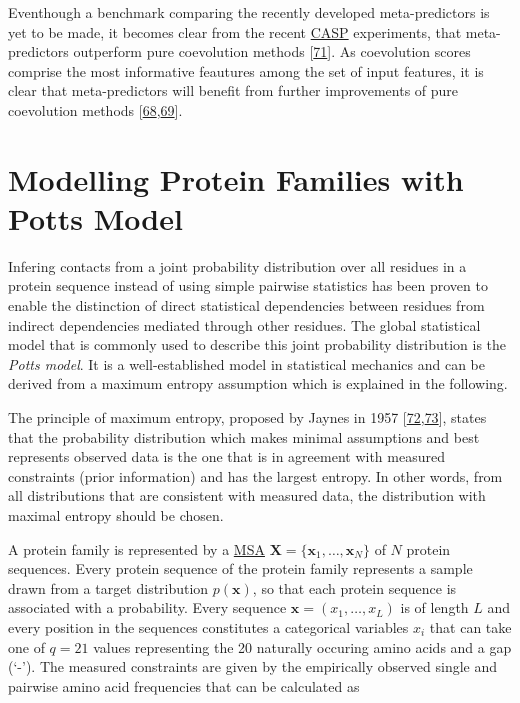 \documentclass[12pt,a4paper,twoside]{book}
\newcommand{\seq}{\mathbf{x}}
\newcommand{\X}{\mathbf{X}}
\theoremstyle{definition}
\theoremstyle{definition}
\theoremstyle{remark}
\begin{document}
Eventhough a benchmark comparing the recently developed meta-predictors
is yet to be made, it becomes clear from the recent
\protect\hyperlink{abbrev}{CASP} experiments, that meta-predictors
outperform pure coevolution methods
{[}\protect\hyperlink{ref-Monastyrskyy2015}{71}{]}. As coevolution
scores comprise the most informative feautures among the set of input
features, it is clear that meta-predictors will benefit from further
improvements of pure coevolution methods
{[}\protect\hyperlink{ref-Wang2016a}{68},\protect\hyperlink{ref-Stahl2017}{69}{]}.

\section{Modelling Protein Families with Potts Model}\label{maxent}

Infering contacts from a joint probability distribution over all
residues in a protein sequence instead of using simple pairwise
statistics has been proven to enable the distinction of direct
statistical dependencies between residues from indirect dependencies
mediated through other residues. The global statistical model that is
commonly used to describe this joint probability distribution is the
\emph{Potts model}. It is a well-established model in statistical
mechanics and can be derived from a maximum entropy assumption which is
explained in the following.

The principle of maximum entropy, proposed by Jaynes in 1957
{[}\protect\hyperlink{ref-Jaynes1957a}{72},\protect\hyperlink{ref-Jaynes1957b}{73}{]},
states that the probability distribution which makes minimal assumptions
and best represents observed data is the one that is in agreement with
measured constraints (prior information) and has the largest entropy. In
other words, from all distributions that are consistent with measured
data, the distribution with maximal entropy should be chosen.

A protein family is represented by a \protect\hyperlink{abbrev}{MSA}
\(\X = \{ \seq_1, \ldots, \seq_N \}\) of \(N\) protein sequences. Every
protein sequence of the protein family represents a sample drawn from a
target distribution \(p(\seq)\), so that each protein sequence is
associated with a probability. Every sequence
\(\seq = (x_1, \ldots, x_L)\) is of length \(L\) and every position in
the sequences constitutes a categorical variables \(x_{i}\) that can
take one of \(q=21\) values representing the 20 naturally occuring amino
acids and a gap (`-'). The measured constraints are given by the
empirically observed single and pairwise amino acid frequencies that can
be calculated as
\end{document}
